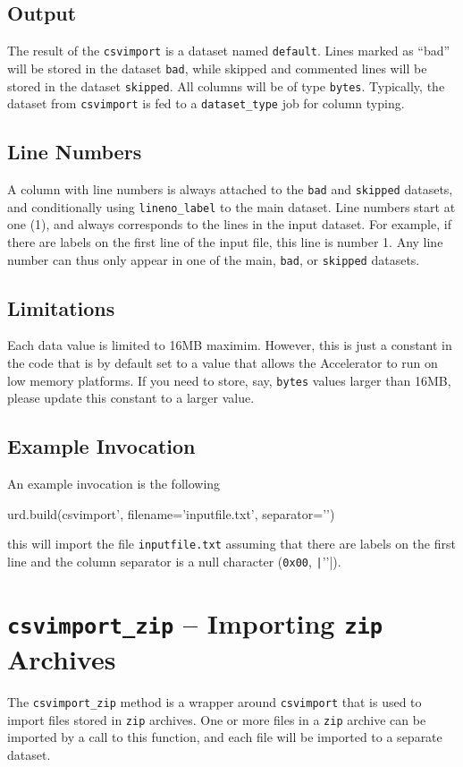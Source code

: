 \subsection{Output}
The result of the \texttt{csvimport} is a dataset named
\texttt{default}.  Lines marked as ``bad'' will be stored in the
dataset \texttt{bad}, while skipped and commented lines will be stored
in the dataset \texttt{skipped}.  All columns will be of type
\texttt{bytes}.  Typically, the dataset from
\texttt{csvimport} is fed to a \texttt{dataset\_type} job for column
typing.


\subsection{Line Numbers}
A column with line numbers is always attached to the \texttt{bad}
and \texttt{skipped} datasets, and conditionally
using \texttt{lineno\_label} to the main dataset.  Line numbers start
at one (1), and always corresponds to the lines in the input dataset.
For example, if there are labels on the first line of the input file,
this line is number 1.  Any line number can thus only appear in one of
the main, \texttt{bad}, or \texttt{skipped} datasets.


\subsection{Limitations}
Each data value is limited to 16MB maximim.  However, this is just a
constant in the code that is by default set to a value that allows the
Accelerator to run on low memory platforms.  If you need to store,
say, \texttt{bytes} values larger than 16MB, please update this
constant to a larger value.


\subsection{Example Invocation}
An example invocation is the following

\begin{python}
urd.build(csvimport', filename='inputfile.txt', separator='\0')
\end{python}
this will import the file \texttt{inputfile.txt} assuming that there
are labels on the first line and the column separator is a null
character (\texttt{0x00}, \texttt|'\0'|).



\clearpage
\section{\texttt{csvimport\_zip} -- Importing \texttt{zip} Archives}
The \texttt{csvimport\_zip} method is a wrapper
around \texttt{csvimport} that is used to import files stored in
\texttt{zip} archives.  One or more files in a \texttt{zip} archive
can be imported by a call to this function, and each file will be
imported to a separate dataset.


